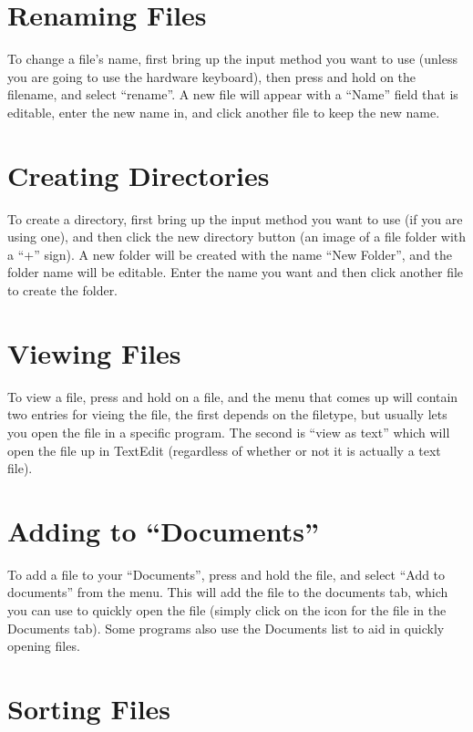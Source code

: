 \documentclass[12pt,letterpaper,oneside, openany]{book} \usepackage[latin1] {inputenc}
\begin{document}
\section{Renaming Files}

To change a file's name, first bring up the input method you want to use (unless you are going to use the hardware keyboard), then press and hold on the filename, and select ``rename''. A new file will appear with a ``Name'' field that is editable, enter the new name in, and click another file to keep the new name. 

\section{Creating Directories}

To create a directory, first bring up the input method you want to use (if you are using one), and then click the new directory button (an image of a file folder with a ``+'' sign). A new folder will be created with the name ``New Folder'', and the folder name will be editable. Enter the name you want and then click another file to create the folder. 

\section{Viewing Files}

To view a file, press and hold on a file, and the menu that comes up will contain two entries for vieing the file, the first depends on the filetype, but usually lets you open the file in a specific program. The second is ``view as text'' which will open the file up in TextEdit (regardless of whether or not it is actually a text file). 

\section{Adding to ``Documents''}

To add a file to your ``Documents'', press and hold the file, and select ``Add to documents'' from the menu. This will add the file to the documents tab, which you can use to quickly open the file (simply click on the icon for the file in the Documents tab). Some programs also use the Documents list to aid in quickly opening files. 


\section{Sorting Files}
\end{document}

